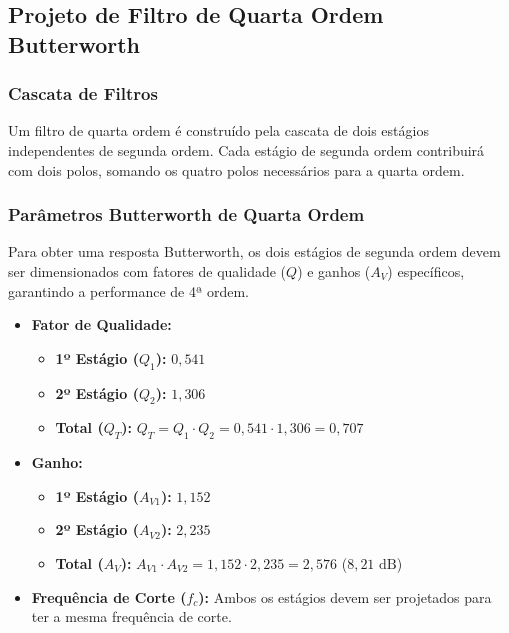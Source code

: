 \subsection{Projeto de Filtro de Quarta Ordem Butterworth}

\subsubsection{Cascata de Filtros}
Um filtro de quarta ordem é construído pela cascata de dois estágios independentes de segunda ordem. Cada estágio de segunda ordem contribuirá com dois polos, somando os quatro polos necessários para a quarta ordem.


\subsubsection{Parâmetros Butterworth de Quarta Ordem}
Para obter uma resposta Butterworth, os dois estágios de segunda ordem devem ser dimensionados com fatores de qualidade ($Q$) e ganhos ($A_V$) específicos, garantindo a performance de 4ª ordem.

\begin{itemize}
    \item \textbf{Fator de Qualidade:}
    \begin{itemize}
        \item \textbf{1º Estágio ($Q_1$):} $0,541$
        \item \textbf{2º Estágio ($Q_2$):} $1,306$
        \item \textbf{Total ($Q_T$):} $Q_T = Q_1 \cdot Q_2 = 0,541 \cdot 1,306 = 0,707$
    \end{itemize}
    \item \textbf{Ganho:}
    \begin{itemize}
        \item \textbf{1º Estágio ($A_{V1}$):} $1,152$
        \item \textbf{2º Estágio ($A_{V2}$):} $2,235$
        \item \textbf{Total ($A_V$):} $A_{V1} \cdot A_{V2} = 1,152 \cdot 2,235 = 2,576$ ($8,21 \text{ dB}$)
    \end{itemize}
    \item \textbf{Frequência de Corte ($f_c$):} Ambos os estágios devem ser projetados para ter a mesma frequência de corte.
\end{itemize}